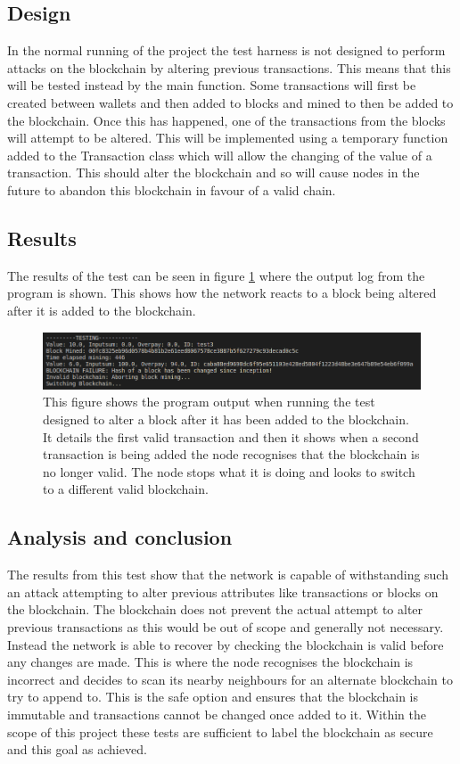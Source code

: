 \documentclass{l4proj}
\begin{document}
\subsection{Design}
In the normal running of the project the test harness is not designed to perform attacks on the blockchain by altering
previous transactions. This means that this will be tested instead by the main function. Some transactions will first
be created between wallets and then added to blocks and mined to then be added to the blockchain. Once this has happened,
one of the transactions from the blocks will attempt to be altered. This will be implemented using a temporary function
added to the Transaction class which will allow the changing of the value of a transaction. This should alter the 
blockchain and so will cause nodes in the future to abandon this blockchain in favour of a valid chain.

\subsection{Results}
The results of the test can be seen in figure \ref{fig:check3} where the output log from the program is shown. This shows
how the network reacts to a block being altered after it is added to the blockchain.

\begin{figure}[!ht]
    \centering
    \includegraphics[width=1\linewidth]{images/check3.png}    
    \caption
    {
        This figure shows the program output when running the test designed to alter a block after it has been added
        to the blockchain. It details the first valid transaction and then it shows when a second transaction is being
        added the node recognises that the blockchain is no longer valid. The node stops what it is doing and looks
        to switch to a different valid blockchain.
    }
    \label{fig:check3} 
\end{figure}

\subsection{Analysis and conclusion}
The results from this test show that the network is capable of withstanding such an attack attempting to alter previous
attributes like transactions or blocks on the blockchain. The blockchain does not prevent the actual attempt to alter
previous transactions as this would be out of scope and generally not necessary. Instead the network is able to recover
by checking the blockchain is valid before any changes are made. This is where the node recognises the blockchain is
incorrect and decides to scan its nearby neighbours for an alternate blockchain to try to append to. This is the safe
option and ensures that the blockchain is immutable and transactions cannot be changed once added to it. Within the
scope of this project these tests are sufficient to label the blockchain as secure and this goal as achieved.
\end{document}
